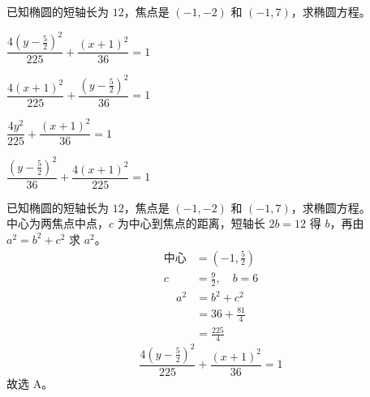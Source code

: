 \documentclass[12pt,a4paper]{exam-zh}
\begin{document}
\begin{question}
    已知椭圆的短轴长为 $12$，焦点是 $(-1,-2)$ 和 $(-1,7)$，求椭圆方程。 \paren[2]
    \begin{choices}
        \item $\dfrac{4\left(y-\frac52\right)^2}{225}+\dfrac{(x+1)^2}{36}=1$
        \item $\dfrac{4(x+1)^2}{225}+\dfrac{\left(y-\frac52\right)^2}{36}=1$
        \item $\dfrac{4y^2}{225}+\dfrac{(x+1)^2}{36}=1$
        \item $\dfrac{\left(y-\frac52\right)^2}{36}+\dfrac{4(x+1)^2}{225}=1$
    \end{choices}
\end{question}

\begin{solution}
    已知椭圆的短轴长为 $12$，焦点是 $(-1,-2)$ 和 $(-1,7)$，求椭圆方程。 \\
    中心为两焦点中点，$c$ 为中心到焦点的距离，短轴长 $2b=12$ 得 $b$，再由 $a^2=b^2+c^2$ 求 $a^2$。 \\
    \begin{align*}
        \text{中心} &= \left(-1,\frac52\right) \\
        c &= \frac92,\quad b=6
    \end{align*}
    \begin{align*}
        a^2 &= b^2+c^2 \\
        &= 36+\frac{81}{4} \\
        &= \frac{225}{4}
    \end{align*}
    \[
        \frac{4\left(y-\frac52\right)^2}{225}+\frac{(x+1)^2}{36}=1
    \]
    故选 A。
\end{solution}
\end{document}
